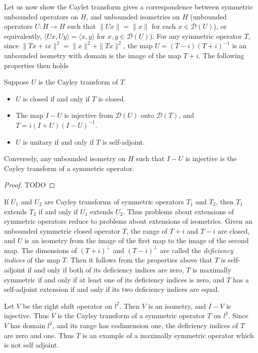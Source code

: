 Let us now show the Caylet transform gives a correspondence between symmetric unbounded operators on $H$, and unbounded isometries on $H$ (unbounded operators $U: H \to H$ such that $\| Ux \| = \| x \|$ for each $x \in \mathcal{D}(U)$), or equivalently, $\langle Ux, Uy \rangle = \langle x, y \rangle$ for $x,y \in \mathcal{D}(U)$). For any symmetric operator $T$, since $\| Tx + ix \|^2 = \| x \|^2 + \| Tx \|^2$, the map $U = (T - i)(T + i)^{-1}$ is an unbounded isometry with domain is the image of the map $T + i$. The following properties then holds

\begin{theorem}
    Suppose $U$ is the Cayley transform of $T$.
    \begin{itemize}
        \item $U$ is closed if and only if $T$ is closed.
        \item The map $I - U$ is injective from $\mathcal{D}(U)$ onto $\mathcal{D}(T)$, and $T = i(I + U)(I - U)^{-1}$.
        \item $U$ is unitary if and only if $T$ is self-adjoint.
    \end{itemize}
    Conversely, any unbounded isometry on $H$ such that $I - U$ is injective is the Cayley transform of a symmetric operator.
\end{theorem}
\begin{proof}
    TODO
\end{proof}

If $U_1$ and $U_2$ are Cayley transforms of symmetric operators $T_1$ and $T_2$, then $T_1$ extends $T_2$ if and only if $U_1$ extends $U_2$. Thus problems about extensions of symmetric operators reduce to problems about extensions of isometries. Given an unbounded symmetric closed operator $T$, the range of $T + i$ and $T - i$ are closed, and $U$ is an isometry from the image of the first map to the image of the second map. The dimensions of $(T + i)^\perp$ and $(T - i)^\perp$ are called the \emph{deficiency indices} of the map $T$. Then it follows from the properties above that $T$ is self-adjoint if and only if both of its deficiency indices are zero, $T$ is maximally symmetric if and only if at least one of its deficiency indices is zero, and $T$ has a self-adjoint extension if and only if its two deficiency indices are equal.

\begin{example}
    Let $V$ be the right shift operator on $l^2$. Then $V$ is an isometry, and $I - V$ is injective. Thus $V$ is the Cayley transform of a symmetric operator $T$ on $l^2$. Since $V$ has domain $l^2$, and its range has codimension one, the deficiency indices of $T$ are zero and one. Thus $T$ is an example of a maximally symmetric operator which is not self adjoint.
\end{example}

